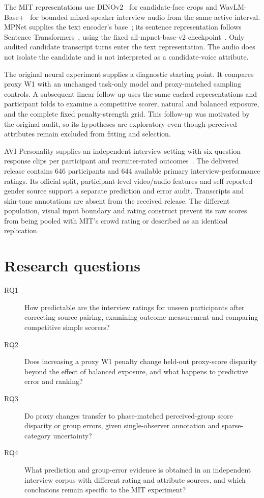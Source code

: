 The MIT representations use DINOv2~\cite{Oquab2024} for candidate-face crops and
WavLM-Base+~\cite{Chen2022WavLM} for bounded mixed-speaker interview audio from the same
active interval. MPNet supplies the text encoder's base~\cite{Song2020MPNet}; its sentence
representation follows Sentence Transformers~\cite{Reimers2019}, using the fixed
all-mpnet-base-v2 checkpoint~\cite{SentenceTransformersAllMPNet2025}.
Only audited candidate transcript turns enter the text representation. The audio does not
isolate the candidate and is not interpreted as a candidate-voice attribute.

The original neural experiment supplies a diagnostic starting point. It compares proxy W1
with an unchanged task-only model and proxy-matched sampling controls. A subsequent linear
follow-up uses the same cached representations and participant folds to examine a competitive
scorer, natural and balanced exposure, and the complete fixed penalty-strength grid. This
follow-up was motivated by the original audit, so its hypotheses are exploratory even though
perceived attributes remain excluded from fitting and selection.

AVI-Personality supplies an independent interview setting with six question-response clips
per participant and recruiter-rated outcomes~\cite{Zhang2026AVI}. The delivered release contains
646 participants and 644 available primary interview-performance ratings. Its official split,
participant-level video/audio features and self-reported gender source support a separate
prediction and error audit. Transcripts and skin-tone annotations are absent from the received
release. The different population, visual input boundary and rating construct prevent its raw
scores from being pooled with MIT's crowd rating or described as an identical replication.

\section{Research questions}

\begin{description}
    \item[RQ1] How predictable are the interview ratings for unseen participants after correcting
    source pairing, examining outcome measurement and comparing competitive simple scorers?

    \item[RQ2] Does increasing a proxy W1 penalty change held-out proxy-score disparity beyond
    the effect of balanced exposure, and what happens to predictive error and ranking?

    \item[RQ3] Do proxy changes transfer to phase-matched perceived-group score disparity or
    group errors, given single-observer annotation and sparse-category uncertainty?

    \item[RQ4] What prediction and group-error evidence is obtained in an independent interview
    corpus with different rating and attribute sources, and which conclusions remain
    specific to the MIT experiment?
\end{description}

